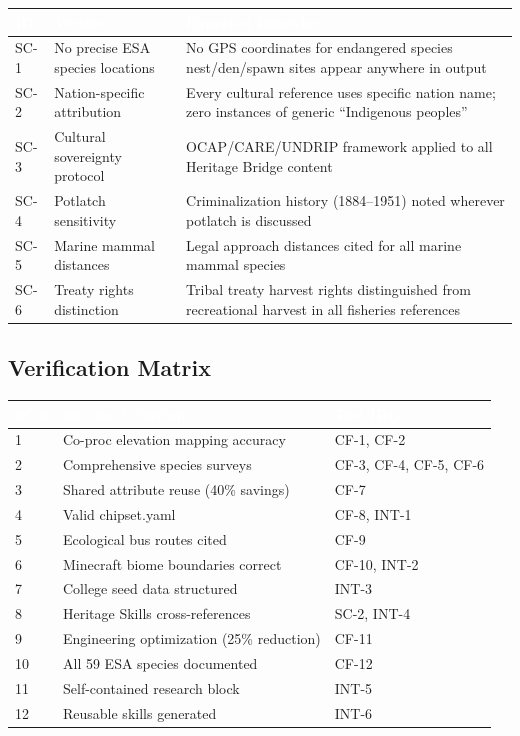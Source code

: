 \documentclass[11pt,letterpaper]{article}
\newcommand{\tableheader}[1]{\textbf{\sffamily\textcolor{white}{#1}}}
\begin{document}
\begin{center}
\begin{tabularx}{\textwidth}{C{1cm}L{3cm}X}
\toprule
{}
\tableheader{ID} & \tableheader{Verifies} & \tableheader{Expected Behavior} \\
\midrule
SC-1 & No precise ESA species locations & No GPS coordinates for endangered species nest/den/spawn sites appear anywhere in output \\
SC-2 & Nation-specific attribution & Every cultural reference uses specific nation name; zero instances of generic ``Indigenous peoples'' \\
SC-3 & Cultural sovereignty protocol & OCAP/CARE/UNDRIP framework applied to all Heritage Bridge content \\
SC-4 & Potlatch sensitivity & Criminalization history (1884--1951) noted wherever potlatch is discussed \\
SC-5 & Marine mammal distances & Legal approach distances cited for all marine mammal species \\
SC-6 & Treaty rights distinction & Tribal treaty harvest rights distinguished from recreational harvest in all fisheries references \\
\bottomrule
\end{tabularx}
\end{center}

\subsection{Verification Matrix}

\begin{center}
\begin{tabularx}{\textwidth}{C{0.8cm}X L{2.5cm}}
\toprule
{}
\tableheader{SC\#} & \tableheader{Success Criterion} & \tableheader{Test ID(s)} \\
 & Co-proc elevation mapping accuracy & CF-1, CF-2 \\
2 & Comprehensive species surveys & CF-3, CF-4, CF-5, CF-6 \\
3 & Shared attribute reuse (40\% savings) & CF-7 \\
4 & Valid chipset.yaml & CF-8, INT-1 \\
5 & Ecological bus routes cited & CF-9 \\
6 & Minecraft biome boundaries correct & CF-10, INT-2 \\
7 & College seed data structured & INT-3 \\
8 & Heritage Skills cross-references & SC-2, INT-4 \\
9 & Engineering optimization (25\% reduction) & CF-11 \\
10 & All 59 ESA species documented & CF-12 \\
11 & Self-contained research block & INT-5 \\
12 & Reusable skills generated & INT-6 \\
\bottomrule
\end{tabularx}
\end{center}
\end{document}
